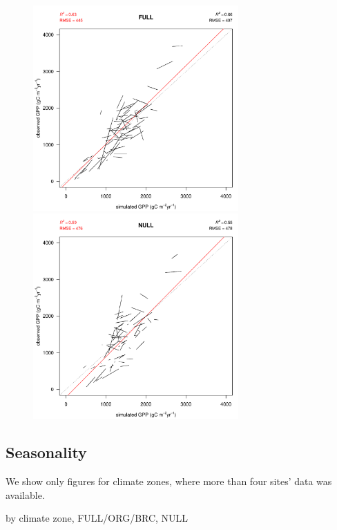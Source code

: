 \documentclass{myreport}
\begin{document}
\begin{figure}[!ht]
    \centering
    \includegraphics[width=0.7\textwidth]{fig/modobs_spatial_annual_FULL.pdf}
    \includegraphics[width=0.7\textwidth]{fig/modobs_spatial_annual_NULL.pdf}
    \caption{}
    \label{fig:modobs_spatialannual}
\end{figure}

\clearpage

\subsection{Seasonality}
 
 We show only figures for climate zones, where more than four sites' data was available.
 
 by climate zone, FULL/ORG/BRC, NULL
 
\end{document}
